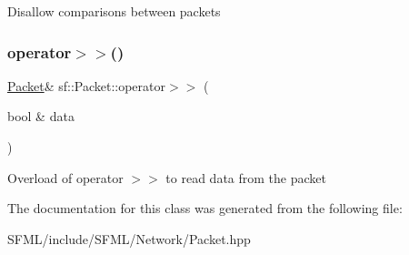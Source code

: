 Disallow comparisons between packets \begin{DoxyVerb}\end{DoxyVerb}
 \mbox{\label{classsf_1_1_packet_af8e26c63ba9bdccd262565ff0d3eeba2}} 
\subsubsection{\texorpdfstring{operator$>$$>$()}{operator>>()}}
{\footnotesize\ttfamily \mbox{\hyperlink{classsf_1_1_packet}{Packet}}\& sf\+::\+Packet\+::operator$>$$>$ (\begin{DoxyParamCaption}\item[{bool \&}]{data }\end{DoxyParamCaption})}

Overload of operator $>$$>$ to read data from the packet \begin{DoxyVerb}\end{DoxyVerb}
 

The documentation for this class was generated from the following file\+:\begin{DoxyCompactItemize}
\item 
S\+F\+M\+L/include/\+S\+F\+M\+L/\+Network/Packet.\+hpp\end{DoxyCompactItemize}

